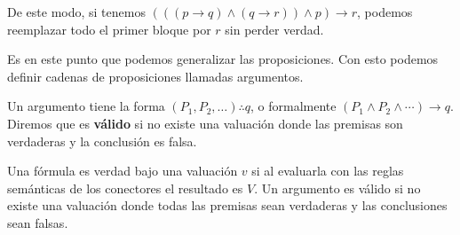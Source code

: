 \documentclass{book}
\begin{document}
  De este modo, si tenemos $(((p \to q) \land (q \to r)) \land p) \to r$, podemos reemplazar
  todo el primer bloque por $r$ sin perder verdad.

  Es en este punto que podemos generalizar las proposiciones. Con esto podemos
  definir cadenas de proposiciones llamadas argumentos.

  \begin{definition}[title=Argumento]
  Un argumento tiene la forma $(P_1, P_2, \ldots) \therefore q$, o formalmente
  $(P_1 \land P_2 \land \cdots) \to q$. Diremos que es \textbf{válido} si no existe
  una valuación donde las premisas son verdaderas y la conclusión es falsa.
  \end{definition}
  
  \begin{definition}[title=Verdad bajo valuación]
  Una fórmula es verdad bajo una valuación $v$ si al evaluarla con las reglas semánticas
  de los conectores el resultado es $V$. Un argumento es válido si no existe una valuación
  donde todas las premisas sean verdaderas y las conclusiones sean falsas.
  \end{definition}
\end{document}
